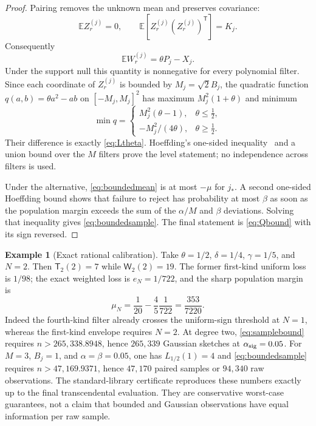 \documentclass[11pt]{article}
\theoremstyle{definition}
\newtheorem{example}[theorem]{Example}
\theoremstyle{remark}
\begin{document}
\begin{proof}
Pairing removes the unknown mean and preserves covariance:
\[
 \mathbb E Z_r^{(j)}=0,\qquad
 \mathbb E[Z_r^{(j)}(Z_r^{(j)})^{\mathsf T}]=K_j.
\]
Consequently
\begin{equation}
 \mathbb E W_r^{(j)}=\theta P_j-X_j.                  \label{eq:boundedmean}
\end{equation}
Under the support null this quantity is nonnegative for every polynomial
filter.  Since each coordinate of $Z_r^{(j)}$ is bounded by
$M_j=\sqrt2B_j$, the quadratic function
$q(a,b)=\theta a^2-ab$ on $[-M_j,M_j]^2$ has maximum
$M_j^2(1+\theta)$ and minimum
\begin{equation}
 \min q=
 \begin{cases}
  M_j^2(\theta-1),&\theta\leq\tfrac12,\\
  -M_j^2/(4\theta),&\theta\geq\tfrac12.
 \end{cases}
\end{equation}
Their difference is exactly \eqref{eq:Ltheta}.  Hoeffding's one-sided
inequality~\cite{Hoeffding1963} and a union bound over the $M$ filters prove the
level statement; no independence across filters is used.

Under the alternative, \eqref{eq:boundedmean} is at most $-\mu$ for $j_*$.  A
second one-sided Hoeffding bound shows that failure to reject has probability
at most $\beta$ as soon as the population margin exceeds the sum of the
$\alpha/M$ and $\beta$ deviations.  Solving that inequality gives
\eqref{eq:boundedsample}.  The final statement is \eqref{eq:Qbound} with its
sign reversed.
\end{proof}

\begin{example}[Exact rational calibration]
Take $\theta=1/2$, $\delta=1/4$, $\gamma=1/5$, and $N=2$.  Then
$\mathsf T_2(2)=7$ while $\mathsf W_2(2)=19$.  The former first-kind uniform
loss is $1/98$; the exact weighted loss is $e_N=1/722$, and the sharp
population margin is
\begin{equation}
 \mu_N=\frac1{20}-\frac45\frac1{722}
      =\frac{353}{7220}.                              \label{eq:rationalmargin}
\end{equation}
Indeed the fourth-kind filter already crosses the uniform-sign threshold at
$N=1$, whereas the first-kind envelope requires $N=2$.  At degree two,
\cref{eq:samplebound} requires $n>265{,}338.8948$, hence $265{,}339$
Gaussian sketches at $\alpha_{\rm sig}=0.05$.
For $M=3$, $B_j=1$, and $\alpha=\beta=0.05$, one has
$L_{1/2}(1)=4$ and \eqref{eq:boundedsample} requires
$n>47{,}169.9371$, hence $47{,}170$ paired samples or $94{,}340$ raw
observations.  The standard-library certificate reproduces these numbers
exactly up to the final transcendental evaluation.  They are conservative
worst-case guarantees, not a claim that bounded and Gaussian observations have
equal information per raw sample.
\end{example}
\end{document}
